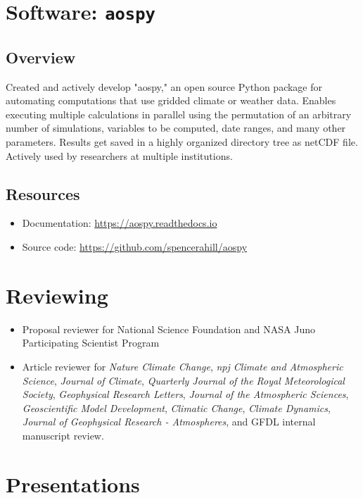 \documentclass[12pt,letterpaper]{shillcv}
\begin{document}
\section*{Software: \texttt{aospy}}
\label{sec:org3cd5d1c}
\subsection*{Overview}
\label{sec:org58106d9}
Created and actively develop "aospy," an open source Python package for
automating computations that use gridded climate or weather data.  Enables
executing multiple calculations in parallel using the permutation of an
arbitrary number of simulations, variables to be computed, date ranges, and many
other parameters.  Results get saved in a highly organized directory tree as
netCDF file.  Actively used by researchers at multiple institutions.

\subsection*{Resources}
\label{sec:org14c0a33}
\begin{itemize}
\item Documentation: \url{https://aospy.readthedocs.io}
\item Source code: \url{https://github.com/spencerahill/aospy}
\end{itemize}
\section*{Reviewing}
\label{sec:org695b1db}
\begin{itemize}
\item Proposal reviewer for National Science Foundation and NASA Juno Participating
Scientist Program
\item Article reviewer for \emph{Nature Climate Change}, \emph{npj Climate and Atmospheric
Science}, \emph{Journal of Climate}, \emph{Quarterly Journal of the Royal Meteorological
Society}, \emph{Geophysical Research Letters}, \emph{Journal of the Atmospheric
Sciences}, \emph{Geoscientific Model Development}, \emph{Climatic Change}, \emph{Climate
Dynamics}, \emph{Journal of Geophysical Research - Atmospheres}, and GFDL internal
manuscript review.
\end{itemize}

\section*{Presentations}
\label{sec:org167948a}
\end{document}
